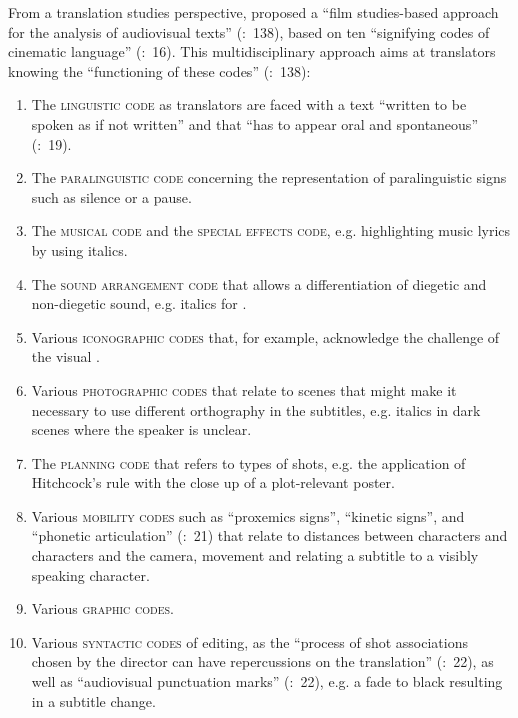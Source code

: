 From a translation studies perspective, \citet{Chaume2004} proposed a “film studies-based approach for the analysis of audiovisual texts” (\citealt{mcclarty2012}:~138), based on ten “signifying codes of cinematic language” (\citealt{Chaume2004}:~16). This multidisciplinary approach aims at translators knowing the “functioning of these codes” (\citealt{mcclarty2012}:~138):


\begin{enumerate}
 \item The \textsc{linguistic code} as translators are faced with a text “written to be spoken as if not written” and that “has to appear oral and spontaneous” (\citealt{Chaume2004}:~19).
 \item The \textsc{paralinguistic code} concerning the representation of paralinguistic signs such as silence or a pause.

 \item The \textsc{musical code} and the \textsc{special effects code}, e.g. highlighting music lyrics by using italics.

 \item The \textsc{sound arrangement code} that allows a differentiation of diegetic and non-diegetic sound, e.g. italics for .

 \item  Various \textsc{iconographic codes} that, for example, acknowledge the challenge of the visual .

 \item  Various \textsc{photographic codes} that relate to scenes that might make it necessary to use different orthography in the subtitles, e.g. italics in dark scenes where the speaker is unclear.

 \item  The \textsc{planning code} that refers to types of shots, e.g. the application of Hitchcock’s rule with the close up of a plot-relevant poster.
 \item Various \textsc{mobility codes} such as “proxemics signs”, “kinetic signs”, and “phonetic articulation” (\citealt{Chaume2004}:~21) that relate to distances between characters and characters and the camera, movement and relating a subtitle to a visibly speaking character.
 \item Various \textsc{graphic codes}.
 \item Various \textsc{syntactic codes} of editing, as the “process of shot associations chosen by the director can have repercussions on the translation” (\citealt{Chaume2004}:~22), as well as “audiovisual punctuation marks” (\citeyear{Chaume2004}:~22), e.g. a fade to black resulting in a subtitle change. 
\end{enumerate}
  

